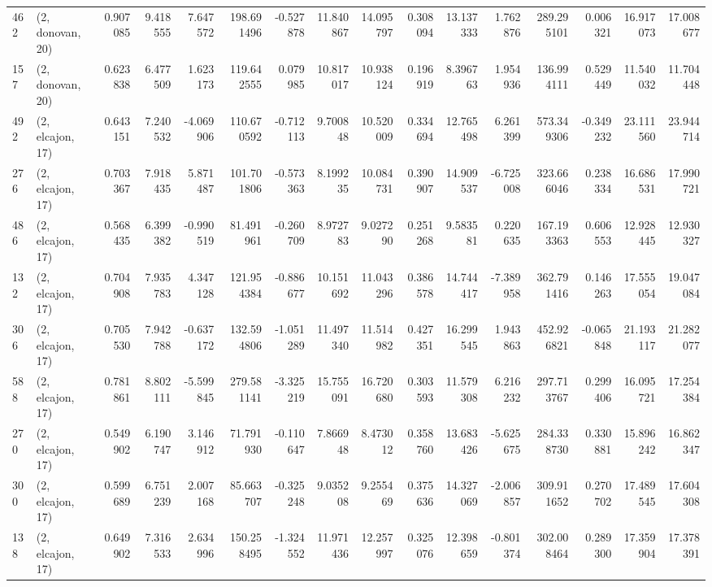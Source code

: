 \begin{tabular}{llrrrrrrrrrrrrrr}
462 &  (2, donovan, 20) &   0.907085 &   9.418555 &   7.647572 &   198.691496 &  -0.527878 &  11.840867 &  14.095797 &  0.308094 &  13.137333 &   1.762876 &   289.295101 &  0.006321 &  16.917073 &  17.008677 \\
157 &  (2, donovan, 20) &   0.623838 &   6.477509 &   1.623173 &   119.642555 &   0.079985 &  10.817017 &  10.938124 &  0.196919 &   8.396763 &   1.954936 &   136.994111 &  0.529449 &  11.540032 &  11.704448 \\
492 &  (2, elcajon, 17) &   0.643151 &   7.240532 &  -4.069906 &   110.670592 &  -0.712113 &   9.700848 &  10.520009 &  0.334694 &  12.765498 &   6.261399 &   573.349306 & -0.349232 &  23.111560 &  23.944714 \\
276 &  (2, elcajon, 17) &   0.703367 &   7.918435 &   5.871487 &   101.701806 &  -0.573363 &   8.199235 &  10.084731 &  0.390907 &  14.909537 &  -6.725008 &   323.666046 &  0.238334 &  16.686531 &  17.990721 \\
486 &  (2, elcajon, 17) &   0.568435 &   6.399382 &  -0.990519 &    81.491961 &  -0.260709 &   8.972783 &   9.027290 &  0.251268 &   9.583581 &   0.220635 &   167.193363 &  0.606553 &  12.928445 &  12.930327 \\
132 &  (2, elcajon, 17) &   0.704908 &   7.935783 &   4.347128 &   121.954384 &  -0.886677 &  10.151692 &  11.043296 &  0.386578 &  14.744417 &  -7.389958 &   362.791416 &  0.146263 &  17.555054 &  19.047084 \\
306 &  (2, elcajon, 17) &   0.705530 &   7.942788 &  -0.637172 &   132.594806 &  -1.051289 &  11.497340 &  11.514982 &  0.427351 &  16.299545 &   1.943863 &   452.926821 & -0.065848 &  21.193117 &  21.282077 \\
588 &  (2, elcajon, 17) &   0.781861 &   8.802111 &  -5.599845 &   279.581141 &  -3.325219 &  15.755091 &  16.720680 &  0.303593 &  11.579308 &   6.216232 &   297.713767 &  0.299406 &  16.095721 &  17.254384 \\
270 &  (2, elcajon, 17) &   0.549902 &   6.190747 &   3.146912 &    71.791930 &  -0.110647 &   7.866948 &   8.473012 &  0.358760 &  13.683426 &  -5.625675 &   284.338730 &  0.330881 &  15.896242 &  16.862347 \\
300 &  (2, elcajon, 17) &   0.599689 &   6.751239 &   2.007168 &    85.663707 &  -0.325248 &   9.035208 &   9.255469 &  0.375636 &  14.327069 &  -2.006857 &   309.911652 &  0.270702 &  17.489545 &  17.604308 \\
138 &  (2, elcajon, 17) &   0.649902 &   7.316533 &   2.634996 &   150.258495 &  -1.324552 &  11.971436 &  12.257997 &  0.325076 &  12.398659 &  -0.801374 &   302.008464 &  0.289300 &  17.359904 &  17.378391 \\

\end{tabular}
